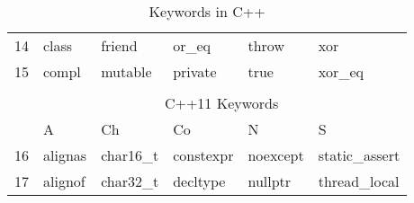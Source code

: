 \begin{table}[!h]
\begin{tabular}{|l|l|l|l|l|l|}
\rowcolor[rgb]{0.753,0.753,0.753} 14 & class & friend & or\_eq & throw & xor \\
15 & compl & mutable & private & true & xor\_eq \\ 
\hline
\multicolumn{1}{l}{} & \multicolumn{1}{l}{} & \multicolumn{1}{l}{} & \multicolumn{1}{l}{} & \multicolumn{1}{l}{} & \multicolumn{1}{l}{} \\ 
\hhline{~-----|}
\multicolumn{1}{l|}{} & \multicolumn{5}{c|}{{\cellcolor[rgb]{1,0.741,0.267}}C++11 Keywords    } \\ 
\cline{2-6}
\multicolumn{1}{l|}{} & A & Ch & Co & N & S \\ 
\hline
\rowcolor[rgb]{0.753,0.753,0.753} 16 & alignas & char16\_t & constexpr & noexcept & static\_assert \\
17 & alignof & char32\_t & decltype & nullptr & thread\_local \\
\hline
\end{tabular}
\caption{Keywords in C++}
\label{tab:t_00_Basics_Keywords_Cpp}
\end{table}